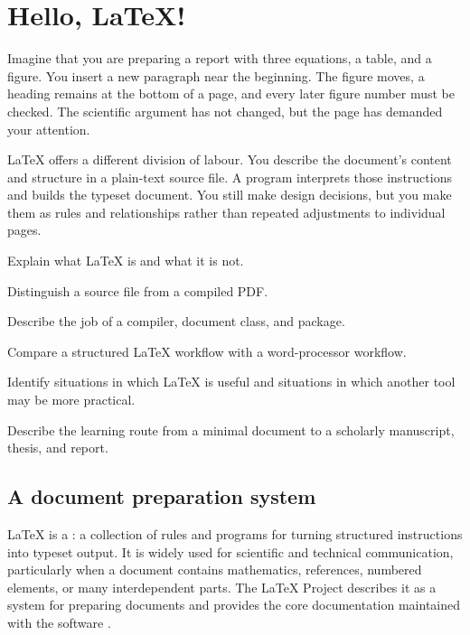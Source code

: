 \chapter{Hello, \LaTeX{}!}
\label{chap:hello}

Imagine that you are preparing a report with three equations, a table, and a
figure. You insert a new paragraph near the beginning. The figure moves, a
heading remains at the bottom of a page, and every later figure number must be
checked. The scientific argument has not changed, but the page has demanded
your attention.

\LaTeX{} offers a different division of labour. You describe the document's
content and structure in a plain-text source file. A program interprets those
instructions and builds the typeset document. You still make design decisions,
but you make them as rules and relationships rather than repeated adjustments
to individual pages.

\begin{learningoutcomes}
  \item Explain what \LaTeX{} is and what it is not.
  \item Distinguish a source file from a compiled PDF.
  \item Describe the job of a compiler, document class, and package.
  \item Compare a structured \LaTeX{} workflow with a word-processor workflow.
  \item Identify situations in which \LaTeX{} is useful and situations in which
        another tool may be more practical.
  \item Describe the learning route from a minimal document to a scholarly
        manuscript, thesis, and report.
\end{learningoutcomes}

\section{A document preparation system}

\LaTeX{} is a : a collection of rules and
programs for turning structured instructions into typeset output. It is widely
used for scientific and technical communication, particularly when a document
contains mathematics, references, numbered elements, or many interdependent
parts. The \LaTeX{} Project describes it as a system for preparing documents and
provides the core documentation maintained with the software
\parencite{latexprojectDocumentation}.

